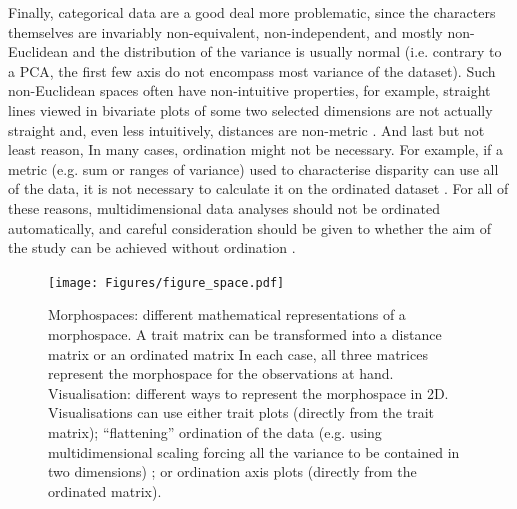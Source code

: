 \documentclass[12pt,letterpaper]{article}
\begin{document}
Finally, categorical data are a good deal more problematic, since the characters themselves are invariably non-equivalent, non-independent, and mostly non-Euclidean and the distribution of the variance is usually normal (i.e. contrary to a PCA, the first few axis do not encompass most variance of the dataset).
Such non-Euclidean spaces often have non-intuitive properties, for example, straight lines viewed in bivariate plots of some two selected dimensions are not actually straight and, even less intuitively, distances are non-metric \citep[i.e. the distance between A and B is not equal to the distance between B and A][]{Gerber2014-ol}.
And last but not least reason, In many cases, ordination might not be necessary.
For example, if a metric (e.g. sum or ranges of variance) used to characterise disparity can use all of the data, it is not necessary to calculate it on the ordinated dataset \citep{Close2015-qi}.
For all of these reasons, multidimensional data analyses should not be ordinated automatically, and careful consideration should be given to whether the aim of the study can be achieved without ordination \citep{lloyd2016,lloyd2018}.


\begin{figure}[!htbp]
\centering
   \texttt{[image: Figures/figure\_space.pdf]}
\caption{
    Morphospaces: different mathematical representations of a morphospace.
    A trait matrix can be transformed into a distance matrix \citep[e.g in][]{Close2015-qi} or an ordinated matrix \citep[e.g. in][]{Brusatte2008-vx}
    In each case, all three matrices represent the morphospace for the observations at hand.
    Visualisation: different ways to represent the morphospace in 2D.
    Visualisations can use either trait plots (directly from the trait matrix); ``flattening'' ordination of the data (e.g. using multidimensional scaling forcing all the variance to be contained in two dimensions)
    ; or ordination axis plots (directly from the ordinated matrix).
}
\label{Fig:morphospace}
\end{figure}
\end{document}
